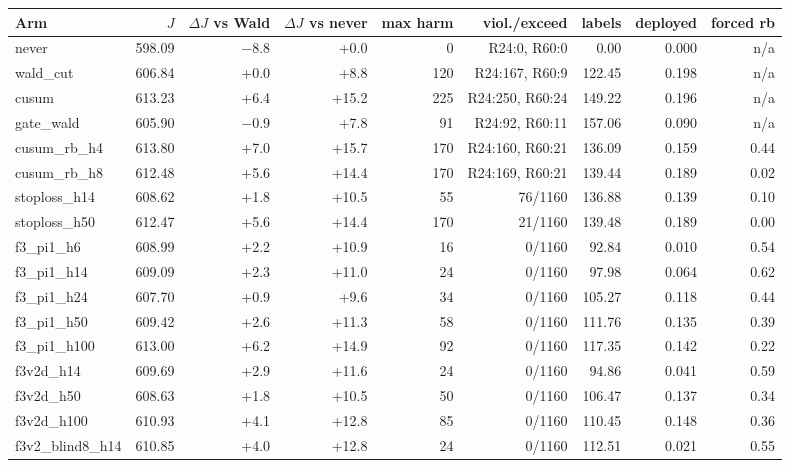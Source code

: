 \begin{tabular}{@{}l r r r r r r r r@{}}
\toprule
Arm & $J$ & $\Delta J$ vs Wald & $\Delta J$ vs never & max harm & viol./exceed & labels & deployed & forced rb \\
\midrule
never & 598.09 & $-$8.8 & +0.0 & 0 & R24:0, R60:0 & 0.00 & 0.000 & n/a \\
wald\_cut & 606.84 & +0.0 & +8.8 & 120 & R24:167, R60:9 & 122.45 & 0.198 & n/a \\
cusum & 613.23 & +6.4 & +15.2 & 225 & R24:250, R60:24 & 149.22 & 0.196 & n/a \\
gate\_wald & 605.90 & $-$0.9 & +7.8 & 91 & R24:92, R60:11 & 157.06 & 0.090 & n/a \\
cusum\_rb\_h4 & 613.80 & +7.0 & +15.7 & 170 & R24:160, R60:21 & 136.09 & 0.159 & 0.44 \\
cusum\_rb\_h8 & 612.48 & +5.6 & +14.4 & 170 & R24:169, R60:21 & 139.44 & 0.189 & 0.02 \\
stoploss\_h14 & 608.62 & +1.8 & +10.5 & 55 & 76/1160 & 136.88 & 0.139 & 0.10 \\
stoploss\_h50 & 612.47 & +5.6 & +14.4 & 170 & 21/1160 & 139.48 & 0.189 & 0.00 \\
f3\_pi1\_h6 & 608.99 & +2.2 & +10.9 & 16 & 0/1160 & 92.84 & 0.010 & 0.54 \\
f3\_pi1\_h14 & 609.09 & +2.3 & +11.0 & 24 & 0/1160 & 97.98 & 0.064 & 0.62 \\
f3\_pi1\_h24 & 607.70 & +0.9 & +9.6 & 34 & 0/1160 & 105.27 & 0.118 & 0.44 \\
f3\_pi1\_h50 & 609.42 & +2.6 & +11.3 & 58 & 0/1160 & 111.76 & 0.135 & 0.39 \\
f3\_pi1\_h100 & 613.00 & +6.2 & +14.9 & 92 & 0/1160 & 117.35 & 0.142 & 0.22 \\
f3v2d\_h14 & 609.69 & +2.9 & +11.6 & 24 & 0/1160 & 94.86 & 0.041 & 0.59 \\
f3v2d\_h50 & 608.63 & +1.8 & +10.5 & 50 & 0/1160 & 106.47 & 0.137 & 0.34 \\
f3v2d\_h100 & 610.93 & +4.1 & +12.8 & 85 & 0/1160 & 110.45 & 0.148 & 0.36 \\
f3v2\_blind8\_h14 & 610.85 & +4.0 & +12.8 & 24 & 0/1160 & 112.51 & 0.021 & 0.55 \\
\bottomrule
\end{tabular}
